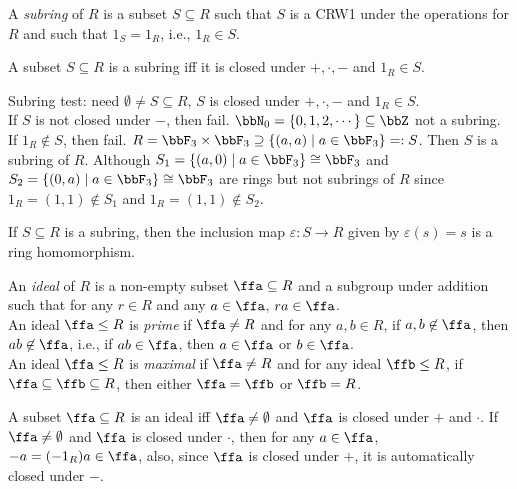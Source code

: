 \begin{definition}
    A \emph{subring} of $R$ is a subset $S \subseteq R$ such that $S$ is a CRW1 under the operations for $R$ and such that $1_S = 1_R$, i.e., $1_R \in S$.
\end{definition}

\begin{fact}
    A subset $S \subseteq R$ is a subring iff it is closed under $+,\cdot,-$ and $1_R \in S$.
\end{fact}

\begin{example}
    Subring test: need $\emptyset \neq S \subseteq R$, $S$ is closed under $+,\cdot,-$ and $1_R \in S$. \\
    If $S$ is not closed under $-$, then fail. $\bbN_0 = \{0,1,2,\cdots\} \subseteq \bbZ$ not a subring. \\
    If $1_R \not \in S$, then fail. $R = \bbF_3 \times \bbF_3 \supseteq \{(a,a) \mid a \in \bbF_3\} =: S$. Then $S$ is a subring of $R$. Although $S_1 = \{(a,0) \mid a \in \bbF_3\} \cong \bbF_3$ and $S_2 = \{(0,a) \mid a \in \bbF_3\} \cong \bbF_3$ are rings but not subrings of $R$ since $1_R = (1,1) \not \in S_1$ and $1_R = (1,1) \not \in S_2$. 
\end{example}

\begin{fact}
    If $S \subseteq R$ is a subring, then the inclusion map $\varepsilon: S \to R$ given by $\varepsilon(s) = s$ is a ring homomorphism.
\end{fact}

\begin{definition}
    An \emph{ideal} of $R$ is a non-empty subset $\ffa \subseteq R$ and a subgroup under addition such that for any $r \in R$ and any $a \in \ffa$, $ra \in \ffa$. \\
    An ideal $\ffa \leq R$ is \emph{prime} if $\ffa \neq R$ and for any $a,b \in R$, if $a,b \not \in \ffa$, then $ab \not \in \ffa$, i.e., if $ab \in \ffa$, then $a \in \ffa$ or $b \in \ffa$. \\
    An ideal $\ffa \leq R$ is \emph{maximal} if $\ffa \neq R$ and for any ideal $\ffb \leq R$, if $\ffa \subseteq \ffb \subseteq R$, then either $\ffa = \ffb$ or $\ffb = R$.
\end{definition}

\begin{fact}
    A subset $\ffa \subseteq R$ is an ideal iff $\ffa \neq \emptyset$ and $\ffa$ is closed under $+$ and $\cdot$. If $\ffa \neq \emptyset$ and $\ffa$ is closed under $\cdot$, then for any $a \in \ffa$, $-a = (-1_R)a \in \ffa$, also, since $\ffa$ is closed under $+$, it is automatically closed under $-$.
\end{fact}


